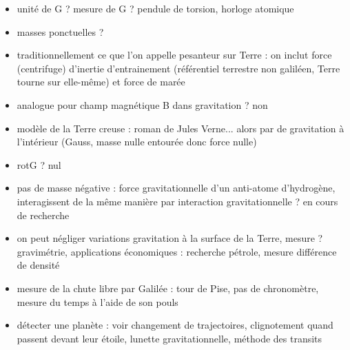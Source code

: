 \begin{remarques} \begin{itemize}
\item unité de G ? mesure de G ? pendule de torsion, horloge atomique
\item masses ponctuelles ?
\item traditionnellement ce que l'on appelle pesanteur sur Terre : on inclut force (centrifuge) d'inertie d'entrainement (référentiel terrestre non galiléen, Terre tourne sur elle-même) et force de marée 
\item analogue pour champ magnétique B dans gravitation ? non
\item modèle de la Terre creuse : roman de Jules Verne... alors par de gravitation à l'intérieur (Gauss, masse nulle entourée donc force nulle)
\item rotG ? nul
\item pas de masse négative : force gravitationnelle d'un anti-atome d'hydrogène, interagissent de la même manière par interaction gravitationnelle ? en cours de recherche
\item on peut négliger variations gravitation à la surface de la Terre, mesure ? gravimétrie, applications économiques : recherche pétrole, mesure différence de densité
\item mesure de la chute libre par Galilée : tour de Pise, pas de chronomètre, mesure du temps à l'aide de son pouls
\item détecter une planète : voir changement de trajectoires, clignotement quand passent devant leur étoile, lunette gravitationnelle, méthode des transits 
\end{itemize} \end{remarques}